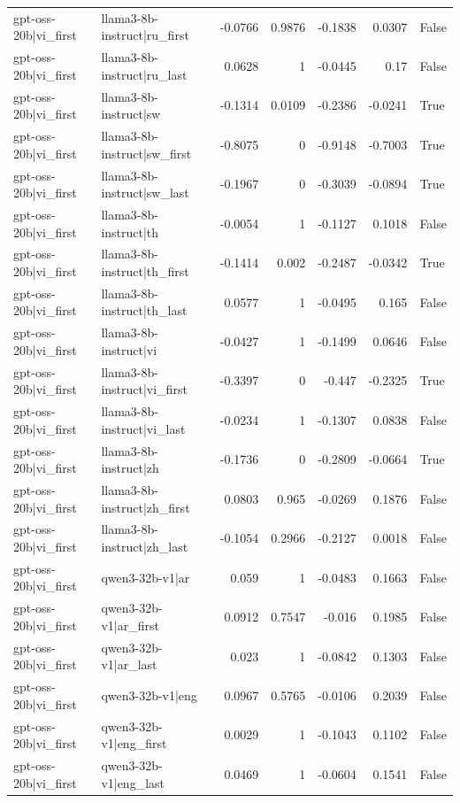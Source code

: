 \begin{table}
\begin{tabular}{l l r r r r l}
gpt-oss-20b|vi_first & llama3-8b-instruct|ru_first & -0.0766 & 0.9876 & -0.1838 & 0.0307 & False \\
gpt-oss-20b|vi_first & llama3-8b-instruct|ru_last & 0.0628 & 1 & -0.0445 & 0.17 & False \\
gpt-oss-20b|vi_first & llama3-8b-instruct|sw & -0.1314 & 0.0109 & -0.2386 & -0.0241 & True \\
gpt-oss-20b|vi_first & llama3-8b-instruct|sw_first & -0.8075 & 0 & -0.9148 & -0.7003 & True \\
gpt-oss-20b|vi_first & llama3-8b-instruct|sw_last & -0.1967 & 0 & -0.3039 & -0.0894 & True \\
gpt-oss-20b|vi_first & llama3-8b-instruct|th & -0.0054 & 1 & -0.1127 & 0.1018 & False \\
gpt-oss-20b|vi_first & llama3-8b-instruct|th_first & -0.1414 & 0.002 & -0.2487 & -0.0342 & True \\
gpt-oss-20b|vi_first & llama3-8b-instruct|th_last & 0.0577 & 1 & -0.0495 & 0.165 & False \\
gpt-oss-20b|vi_first & llama3-8b-instruct|vi & -0.0427 & 1 & -0.1499 & 0.0646 & False \\
gpt-oss-20b|vi_first & llama3-8b-instruct|vi_first & -0.3397 & 0 & -0.447 & -0.2325 & True \\
gpt-oss-20b|vi_first & llama3-8b-instruct|vi_last & -0.0234 & 1 & -0.1307 & 0.0838 & False \\
gpt-oss-20b|vi_first & llama3-8b-instruct|zh & -0.1736 & 0 & -0.2809 & -0.0664 & True \\
gpt-oss-20b|vi_first & llama3-8b-instruct|zh_first & 0.0803 & 0.965 & -0.0269 & 0.1876 & False \\
gpt-oss-20b|vi_first & llama3-8b-instruct|zh_last & -0.1054 & 0.2966 & -0.2127 & 0.0018 & False \\
gpt-oss-20b|vi_first & qwen3-32b-v1|ar & 0.059 & 1 & -0.0483 & 0.1663 & False \\
gpt-oss-20b|vi_first & qwen3-32b-v1|ar_first & 0.0912 & 0.7547 & -0.016 & 0.1985 & False \\
gpt-oss-20b|vi_first & qwen3-32b-v1|ar_last & 0.023 & 1 & -0.0842 & 0.1303 & False \\
gpt-oss-20b|vi_first & qwen3-32b-v1|eng & 0.0967 & 0.5765 & -0.0106 & 0.2039 & False \\
gpt-oss-20b|vi_first & qwen3-32b-v1|eng_first & 0.0029 & 1 & -0.1043 & 0.1102 & False \\
gpt-oss-20b|vi_first & qwen3-32b-v1|eng_last & 0.0469 & 1 & -0.0604 & 0.1541 & False \\

\end{tabular}
\end{table}
